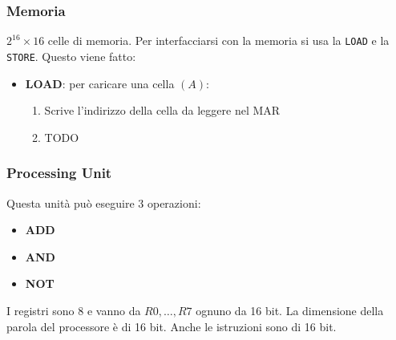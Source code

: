 \documentclass[a4paper]{article}
\theoremstyle{break}
\theoremstyle{break}
\theoremstyle{break}
\theoremstyle{break}
\begin{document}
\subsubsection{Memoria}
\( 2^16 \times 16 \) celle di memoria. Per interfacciarsi con la memoria si usa la
\texttt{LOAD} e la \texttt{STORE}. Questo viene fatto:
\begin{itemize}
	\item \textbf{LOAD}: per caricare una cella \( (A) \):
	      \begin{enumerate}
		      \item Scrive l'indirizzo della cella da leggere nel MAR
		      \item
		            TODO
	      \end{enumerate}
\end{itemize}

\subsubsection{Processing Unit}
Questa unità può eseguire 3 operazioni:
\begin{itemize}
	\item \textbf{ADD}
	\item \textbf{AND}
	\item \textbf{NOT}
\end{itemize}

\vspace{1em}
\noindent I registri sono 8 e vanno da \( R0, \ldots, R7 \) ognuno da 16 bit. La dimensione
della parola del processore è di 16 bit. Anche le istruzioni sono di 16 bit.
\end{document}
